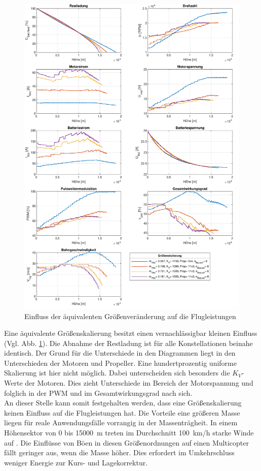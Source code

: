 \begin{figure}[H]
	\includegraphics[scale=0.7]{Diagramme/Groessenskalierung.pdf}
	\caption{Einfluss der äquivalenten Größenveränderung auf die Flugleistungen}
	\label{abb:groessenskalierung}
\end{figure}
Eine äquivalente Größenskalierung besitzt einen vernachlässigbar kleinen Einfluss (Vgl. Abb. \ref{abb:groessenskalierung}). Die Abnahme der Restladung ist für alle Konstellationen beinahe identisch. Der Grund für die Unterschiede in den Diagrammen liegt in den Unterschieden der Motoren und Propeller. Eine hundertprozentig uniforme Skalierung ist hier nicht möglich. Dabei unterscheiden sich besonders die \ensuremath{K_V}-Werte der Motoren. Dies zieht Unterschiede im Bereich der Motorspannung und folglich in der PWM und im Gesamtwirkungsgrad nach sich. \\
An dieser Stelle kann somit festgehalten werden, dass eine Größenskalierung keinen Einfluss auf die Flugleistungen hat. Die Vorteile eine größeren Masse liegen für reale Anwendungsfälle vorrangig in der Massenträgheit. In einem Höhensektor von \SI{0}{} bis \SI{15000}{m} treten im Durchschnitt \SI{100}{km/h} starke Winde auf \cite{Seidel.2011}. Die Einflüsse von Böen in diesen Größenordnungen auf einen Multicopter fällt geringer aus, wenn die Masse höher. Dies erfordert im Umkehrschluss weniger Energie zur Kurs- und Lagekorrektur. \\
